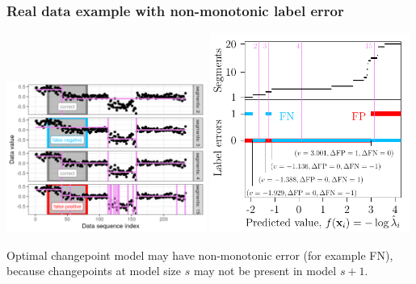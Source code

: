\documentclass{beamer}
\begin{document}
\begin{frame}
  \frametitle{Real data example with non-monotonic label error}

  \includegraphics[width=0.49\textwidth]{figure-fn-not-monotonic}
  \includegraphics[width=0.49\textwidth]{figure-fn-not-monotonic-error-standAlone}

  Optimal changepoint model may have non-monotonic error (for example
  FN), because changepoints at model size $s$ may not be present in
  model $s+1$.

\end{frame}
\end{document}
